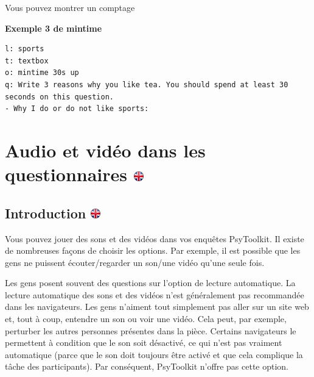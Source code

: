 \documentclass[
]{book}
\begin{document}
Vous pouvez montrer un comptage

\textbf{Exemple 3 de mintime}

\begin{verbatim}
l: sports
t: textbox
o: mintime 30s up
q: Write 3 reasons why you like tea. You should spend at least 30 seconds on this question.
- Why I do or do not like sports:
\end{verbatim}

\hypertarget{audio-et-viduxe9o-dans-les-questionnaires}{%
\chapter[Audio et vidéo dans les questionnaires ]{\texorpdfstring{Audio
et vidéo dans les questionnaires
\href{https://www.psytoolkit.org/lessons/surveyaudiovideo.html}{\protect\includegraphics{img/ukflag.png}}}{Audio et vidéo dans les questionnaires }}\label{audio-et-viduxe9o-dans-les-questionnaires}}

\hypertarget{introduction}{%
\section[Introduction ]{\texorpdfstring{Introduction
\href{https://www.psytoolkit.org/lessons/surveyaudiovideo.html\#_introduction}{\protect\includegraphics{img/ukflag.png}}}{Introduction }}\label{introduction}}

Vous pouvez jouer des sons et des vidéos dans vos enquêtes PsyToolkit.
Il existe de nombreuses façons de choisir les options. Par exemple, il
est possible que les gens ne puissent écouter/regarder un son/une vidéo
qu'une seule fois.

Les gens posent souvent des questions sur l'option de lecture
automatique. La lecture automatique des sons et des vidéos n'est
généralement pas recommandée dans les navigateurs. Les gens n'aiment
tout simplement pas aller sur un site web et, tout à coup, entendre un
son ou voir une vidéo. Cela peut, par exemple, perturber les autres
personnes présentes dans la pièce. Certains navigateurs le permettent à
condition que le son soit désactivé, ce qui n'est pas vraiment
automatique (parce que le son doit toujours être activé et que cela
complique la tâche des participants). Par conséquent, PsyToolkit n'offre
pas cette option.
\end{document}
